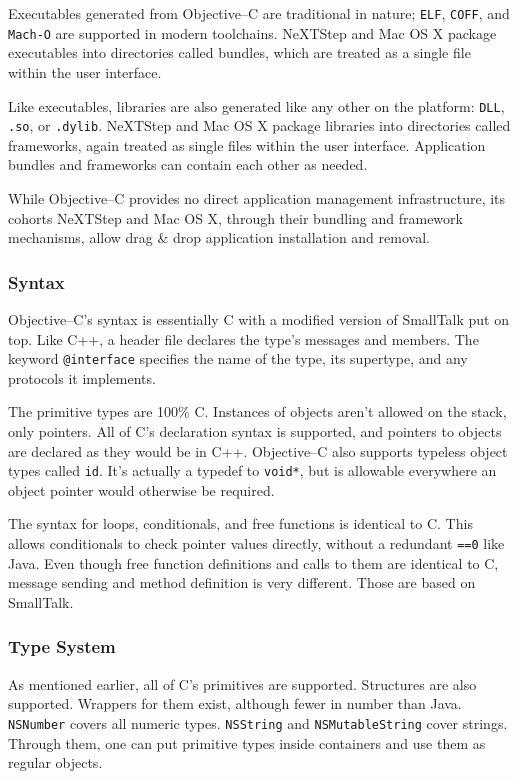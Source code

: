 Executables generated from Objective--C are traditional in nature;
\texttt{ELF}, \texttt{COFF}, and \texttt{Mach-O} are supported in modern
toolchains. NeXTStep and Mac OS X package executables into directories called
bundles, which are treated as a single file within the user interface.

Like executables, libraries are also generated like any other on the platform:
\texttt{DLL}, \texttt{.so}, or \texttt{.dylib}. NeXTStep and Mac OS X package
libraries into directories called frameworks, again treated as single files
within the user interface. Application bundles and frameworks can contain each
other as needed.

While Objective--C provides no direct application management infrastructure,
its cohorts NeXTStep and Mac OS X, through their bundling and framework
mechanisms, allow drag \& drop application installation and removal.

\subsubsection{Syntax}

Objective--C's syntax is essentially C with a modified version of SmallTalk
put on top. Like C++, a header file declares the type's messages and members.
The keyword \texttt{@interface} specifies the name of the type, its supertype,
and any protocols it implements.

The primitive types are 100\% C. Instances of objects aren't allowed on the
stack, only pointers. All of C's declaration syntax is supported, and pointers
to objects are declared as they would be in C++. Objective--C also supports
typeless object types called \texttt{id}. It's actually a typedef to
\texttt{void*}, but is allowable everywhere an object pointer would otherwise
be required.

The syntax for loops, conditionals, and free functions is identical to C. This
allows conditionals to check pointer values directly, without a redundant
\texttt{==0} like Java. Even though free function definitions and calls to
them are identical to C, message sending and method definition is very
different. Those are based on SmallTalk.

\subsubsection{Type System}

As mentioned earlier, all of C's primitives are supported. Structures are also
supported. Wrappers for them exist, although fewer in number than Java.
\texttt{NSNumber} covers all numeric types. \texttt{NSString} and
\texttt{NSMutableString} cover strings. Through them, one can put primitive
types inside containers and use them as regular objects.

